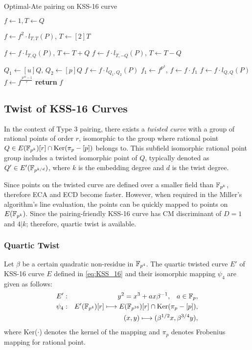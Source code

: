\begin{algorithm}[ht]
	\caption{Optimal-Ate pairing on KSS-16 curve}
	\label{indo_kss16_optimal_algo}
	\DontPrintSemicolon

	
	 $f \leftarrow 1,T \leftarrow Q$\;
	  {
	 $f\leftarrow f^2\cdot l_{T,T}(P)$, $T\leftarrow [2]T$\;

	  {
	 $f\leftarrow f\cdot l_{T,Q}(P)$, $T\leftarrow T+Q$}
      {
	 $f\leftarrow f\cdot l_{T,-Q}(P)$, $T\leftarrow T-Q$}}
  
	 $Q_1\leftarrow [u]Q$, $Q_2\leftarrow [p]Q$\;
	 $f\leftarrow f\cdot l_{Q_1,Q_2}(P)$\;
	 $f_1\leftarrow f^{p^3}$, $f\leftarrow f\cdot f_1$\;
	 $f\leftarrow f\cdot l_{Q,Q}(P)$\;
	 $f\leftarrow f^{\frac{p^{16}-1}{r}}$\;
	 {\bf return} $f$\;
\end{algorithm}
\vspace{-0.6em}


\subsection{Twist of KSS-16 Curves} 
In the context of  Type 3 pairing, there exists a \textit{twisted curve} with a group of rational points of order $r$, isomorphic to the group where rational point $Q \in  E({\mathbb{F}}_{p^{k}}) [r] \cap \text{Ker}(\pi_p - [p])$  belongs to. This subfield isomorphic rational point group includes a twisted isomorphic point of $Q$, typically denoted as $Q' \in E'(\mathbb{F}_{p^{k/d}})$, where $k$ is the embedding degree and $d$ is the twist degree.  

Since points on the twisted curve are defined over a smaller field than $\mathbb{F}_{p^k}$, therefore ECA and ECD become faster. 
However, when required in the Miller's algorithm's line evaluation, the points can be quickly mapped to points on $E(\mathbb{F}_{p^k} )$. 
Since the pairing-friendly KSS-16 \cite{EPRINT:KacSchSco07} curve has CM discriminant of $D = 1$ and $4|k$; therefore, quartic twist is available.
\subsubsection{Quartic Twist} 
\label{sec:ch:indo:Quartic_twist}
Let $\beta$ be a certain quadratic non-residue in $\mathbb{F}_{p^4}$.  The quartic twisted curve $E'$ of KSS-16  curve $E$ defined in \eqref{eq:KSS_16} and  their isomorphic mapping $\psi_4$ are given as follows:
\begin{eqnarray}
	E'&:&y^2=x^3+ax\beta^{-1},\;\;\;a\in{\mathbb{F}}_{p}, \nonumber\\
	\psi_4&:&E'(\mathbb{F}_{p^4})[r] \longmapsto E(\mathbb{F}_{p^{16}})[r]\cap {\rm Ker}(\pi_p-[p]),\nonumber\\
	&&(x,y)\longmapsto (\beta^{1/2}x,\beta^{3/4}y),\label{kss16_quartic_twisted_map}
\end{eqnarray}
where Ker($\cdot$) denotes the kernel of the mapping and $\pi_p$ denotes Frobenius mapping  for rational point.

